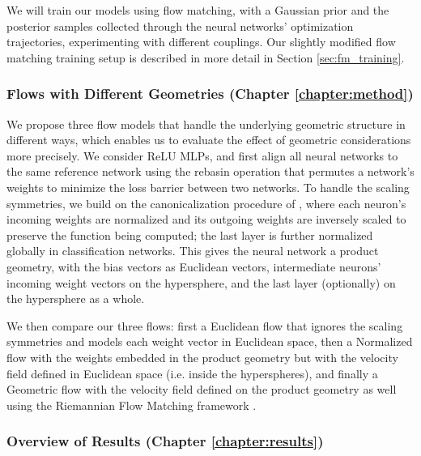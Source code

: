 We will train our models using flow matching, with a Gaussian prior and the posterior samples collected through the neural networks' optimization trajectories, experimenting with different couplings. Our slightly modified flow matching training setup is described in more detail in Section \ref{sec:fm_training}.

\subsubsection{Flows with Different Geometries (Chapter \ref{chapter:method})}

We propose three flow models that handle the underlying geometric structure in different ways, which enables us to evaluate the effect of geometric considerations more precisely. We consider ReLU MLPs, and first align all neural networks to the same reference network using the rebasin operation \citep{ainsworthGitReBasinMerging2023,penaReBasinImplicitSinkhorn2023} that permutes a network's weights to minimize the loss barrier between two networks.  To handle the scaling symmetries, we build on the canonicalization procedure of \citep{pittorinoDeepNetworksToroids2022}, where each neuron's incoming weights are normalized and its outgoing weights are inversely scaled to preserve the function being computed; the last layer is further normalized globally in classification networks. This gives the neural network a product geometry, with the bias vectors as Euclidean vectors, intermediate neurons' incoming weight vectors on the hypersphere, and the last layer (optionally) on the hypersphere as a whole. 

We then compare our three flows: first a Euclidean flow that ignores the scaling symmetries and models each weight vector in Euclidean space, then a Normalized flow with the weights embedded in the product geometry but with the velocity field defined in Euclidean space (i.e. inside the hyperspheres), and finally a Geometric flow with the velocity field defined on the product geometry as well using the Riemannian Flow Matching framework \citep{chenRiemannianFlowMatching2023}. 

\subsubsection{Overview of Results (Chapter \ref{chapter:results})}

